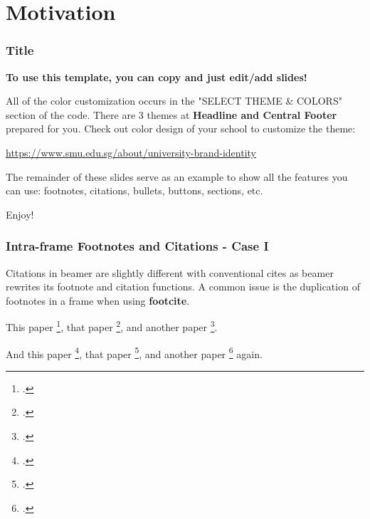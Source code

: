 \section{Motivation} %

\begin{frame}
    \frametitle{Title}
    \begin{center}
        \textbf{To use this template, you can copy and just edit/add slides!} \newline
    \end{center}

    All of the color customization occurs in the "SELECT THEME \& COLORS" section of the code. 
    There are 3 themes at \textbf{Headline and Central Footer} prepared for you. 
    Check out color design of your school to customize the theme:\newline

    \begin{center}
        \href{https://www.smu.edu.sg/about/university-brand-identity}{https://www.smu.edu.sg/about/university-brand-identity} \newline
    \end{center}

    The remainder of these slides serve as an example to show all the features you can use: footnotes, citations, bullets, buttons, sections, etc.

    \begin{center}
        {\Huge\calligra Enjoy!}
    \end{center}
\end{frame}

\begin{frame}
    \frametitle{Intra-frame Footnotes and Citations - Case I}
    
    Citations in beamer are slightly different with conventional cites as beamer rewrites its footnote and citation functions. 
    A common issue is the duplication of footnotes in a frame when using \textbf{footcite}. \newline

    This paper \footcite{Harshman1970}, that paper \footcite{Hitchcock1927}, and another paper \footcite{Carroll1970}. \newline

    And this paper \footcite{Harshman1970}, that paper \footcite{Hitchcock1927}, and another paper \footcite{Carroll1970} again. 
\end{frame}

